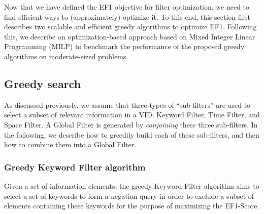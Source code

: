 Now that we have defined the EF1 objective for filter optimization, we need to find efficient ways to (approximately) optimize it.  To this end, this section first describes two scalable and efficient greedy algorithms to optimize EF1.
Following this, we describe an optimization-based approach based on Mixed Integer Linear Programming (MILP) to benchmark the performance of the proposed greedy algorithms on moderate-sized problems.

\subsection{Greedy search}


As discussed previously, we assume that three types of ``sub-filters'' are used to select a subset of relevant information in a VID: Keyword Filter, Time Filter, and Space Filter.  A Global Filter is generated by \emph{conjoining} these three sub-filters. In the following, we describe how to greedily build each of these sub-filters, and then how to combine them into a Global Filter.

\subsubsection{Greedy Keyword Filter algorithm}

Given a set of information elements, the greedy Keyword Filter algorithm aims to select a set of keywords to form a negation query in order to exclude a subset of elements containing these keywords for the purpose of maximizing the EF1-Score.

